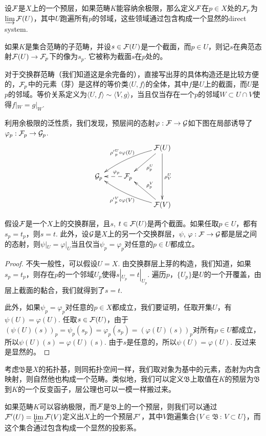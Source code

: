 \begin{para}
设$\mathcal{F}$是$X$上的一个预层，如果范畴$K$能容纳余极限，那么定义$\mathcal{F}$在$p\in X$处的$\mathcal{F}_p$为$\varinjlim \mathcal{F}(U)$，其中$U$跑遍所有$p$的邻域，这些领域通过包含构成一个显然的direct system. 

如果$K$是集合范畴的子范畴，并设$s\in \mathcal{F}(U)$是一个截面，而$p\in U$，则记$s$在典范态射$\mathcal{F}(U)\to \mathcal{F}_p$下的像为$s_p$. 它被称为截面$s$在$p$处的。

对于交换群范畴（我们知道这是余完备的），直接写出芽的具体构造还是比较方便的，$\mathcal{F}_p$中的元素（芽）是这样的等价类$\langle U,f\rangle$的全体，其中$f$是$U$上的截面，而$U$是$p$的邻域。等价关系定义为$\langle U,f\rangle\sim \langle V,g\rangle$，当且仅当存在一个$p$的邻域$W\subset U\cap V$使得$f|_W=g|_W$. 
\end{para}

利用余极限的泛性质，我们发现，预层间的态射$\varphi:\mathcal{F}\to\mathcal{G}$如下图在局部诱导了$\varphi_p:\mathcal{F}_p\to\mathcal{G}_p$.
\[
	\xymatrix{
		&&\calf(U)\ar[dl]^{\rho^U_{p}}\ar[dd]^{\rho^U_{V}}\ar@/_/[lld]_{{\rho'}^U_{p}\circ\varphi(U)} \\
		\calg_p&\calf_p\ar@{-->}[l]_(0.4){\varphi_p}&\\
		&&\calf(V)\ar[ul]_{\rho^V_{p}}\ar@/^/[llu]^{{\rho'}^V_{p}\circ\varphi(V)}
	}
\]

\begin{lem}\label{lem:1}
假设$\mathcal{F}$是一个$X$上的交换群层，且$s$, $t\in \mathcal{F}(U)$是两个截面。如果任取$p\in U$，都有$s_p=t_p$，则$s=t$. 此外，设$\mathcal{G}$是$X$上的另一个交换群层，$\psi$, $\varphi:\mathcal{F}\to\mathcal{G}$都是层之间的态射，则$\psi|_U=\varphi|_U$当且仅当$\psi_p=\varphi_p$对任意的$p\in U$都成立。
\end{lem}

\begin{proof}
不失一般性，可以假设$U=X$. 由交换群层上芽的构造，我们知道，如果$s_p=t_p$，则存在$p$的一个邻域$U_p$使得$s|_{U_p}=t|_{U_p}$. 遍历$p$，$\{U_p\}$是$U$的一个开覆盖，由层上截面的黏合，我们就得到了$s=t$.

此外，如果$\psi_p=\varphi_p$对任意的$p\in X$都成立，我们要证明，任取开集$U$，有$\psi(U)=\varphi(U)$. 任取$s\in \mathcal{F}(U)$，由于$(\psi(U)(s))_p=\psi_p(s_p)=\varphi_p(s_p)=(\varphi(U)(s))_p$对所有$p\in U$都成立，所以$\psi(U)(s)=\varphi(U)(s)$. 由于$s$是任意的，所以$\psi(U)=\varphi(U)$. 反过来是显然的。
\end{proof}

\begin{para}
考虑$\mathfrak{B}$是$X$的拓扑基，则同拓扑空间一样，我们取对象为基中的元素，态射为内含映射，则自然他也构成一个范畴。类似地，我们可以定义$\mathfrak{B}$上取值在$K$的预层为$\mathfrak{B}$到$K$的一个反变函子，层公理也可以一模一样搬过来。

如果范畴$K$可以容纳极限，而$\mathcal{F}$是$\mathfrak{B}$上的一个预层，则我们可以通过$\mathcal{F}'(U)=\varprojlim \mathcal{F}(V)$定义出$X$上的一个预层$\mathcal{F}'$，其中$V$跑遍集合$\{V\in \mathfrak{B}\,:\, V\subset U\}$，而这个集合通过包含构成一个显然的投影系。
\end{para}

